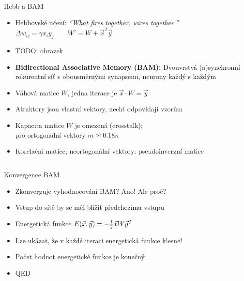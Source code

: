 \documentclass{beamer}
\begin{document}
\subsection{}
\begin{frame}{Hebb a BAM}
\begin{itemize}
\item Hebbovské učení: {\em ``What fires together, wires together.''} \\
	$\Delta w_{ij} = \gamma x_i y_j \qquad W' = W + \vec x^T \vec y$
\item TODO: obrazek
\item {\bf Bidirectional Associative Memory (BAM):}
	Dvouvrstvá (a)synchronní rekurentní síť s obousměrnými synapsemi, neurony každý s každým
\item Váhová matice $W$, jedna iterace je $\vec x \cdot W = \vec y$
\item Atraktory jsou vlastní vektory, nechť odpovídají vzorům
\item Kapacita matice $W$ je omezená (crosstalk); \\
	pro ortogonální vektory $m \simeq 0.18 n$
\item Korelační matice; neortogonální vektory: pseudoinverzní matice
\end{itemize}
\end{frame}

\subsection{}
\begin{frame}{Konvergence BAM}
\begin{itemize}
\item Zkonverguje vyhodnocování BAM? \pause Ano! Ale proč?
\pause
\item Vstup do sítě by se měl blížit předchozímu vstupu
\item Energetická funkce $E(\vec x, \vec y) = -{1 \over 2}\vec x W \vec y^T$
\item Lze ukázat, že v každé iteraci energetická funkce klesne!
\pause
\item Počet hodnot energetické funkce je konečný
\item QED
\end{itemize}
\end{frame}
\end{document}
